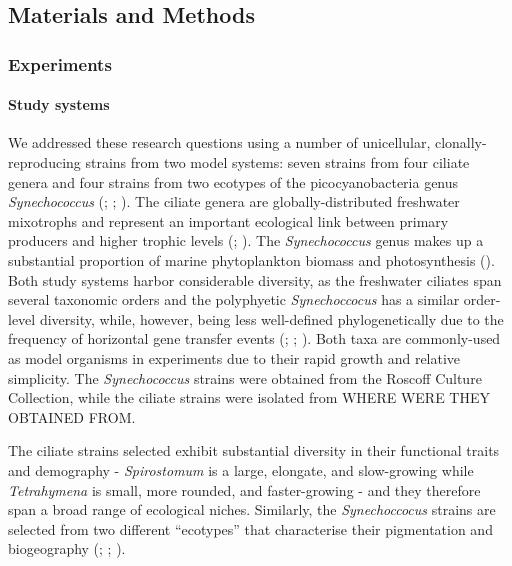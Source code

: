 \documentclass[
  letterpaper,
  DIV=11,
  numbers=noendperiod]{scrartcl}
\let\oldparagraph\paragraph
\renewcommand{\paragraph}[1]{\oldparagraph{#1}\mbox{}}
\begin{document}
\subsection{Materials and Methods}\label{sec-DAE_methods}

\subsubsection{Experiments}\label{experiments}

\paragraph{Study systems}\label{study-systems}

We addressed these research questions using a number of unicellular,
clonally-reproducing strains from two model systems: seven strains from
four ciliate genera and four strains from two ecotypes of the
picocyanobacteria genus \emph{Synechococcus}
(;
;
). The ciliate genera are
globally-distributed freshwater mixotrophs and represent an important
ecological link between primary producers and higher trophic levels
(;
). The
\emph{Synechococcus} genus makes up a substantial proportion of marine
phytoplankton biomass and photosynthesis
(). Both study systems
harbor considerable diversity, as the freshwater ciliates span several
taxonomic orders and the polyphyetic \emph{Synechoccocus} has a similar
order-level diversity, while, however, being less well-defined
phylogenetically due to the frequency of horizontal gene transfer events
(;
;
). Both taxa are
commonly-used as model organisms in experiments due to their rapid
growth and relative simplicity. The \emph{Synechococcus} strains were
obtained from the Roscoff Culture Collection, while the ciliate strains
were isolated from WHERE WERE THEY OBTAINED FROM.

The ciliate strains selected exhibit substantial diversity in their
functional traits and demography - \emph{Spirostomum} is a large,
elongate, and slow-growing while \emph{Tetrahymena} is small, more
rounded, and faster-growing - and they therefore span a broad range of
ecological niches. Similarly, the \emph{Synechoccocus} strains are
selected from two different ``ecotypes'' that characterise their
pigmentation and biogeography (; ;
).
\end{document}
